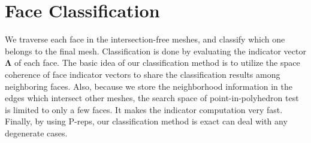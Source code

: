 \documentclass[10pt,journal,compsoc]{IEEEtran}
\begin{document}




\section{Face Classification}

\label{sec:classification}
We traverse each face in the intersection-free meshes, and classify which one belongs to the final mesh. Classification is done by evaluating the indicator vector $\bm{\Lambda}$ of each face. The basic idea of our classification method is to utilize the space coherence of face indicator vectors to share the classification results among neighboring faces. Also, because we store the neighborhood information in the edges which intersect other meshes, the search space of point-in-polyhedron test is limited to only a few faces. It makes the indicator computation very fast. Finally, by using P-reps, our classification method is exact can deal with any degenerate cases.
\end{document}
